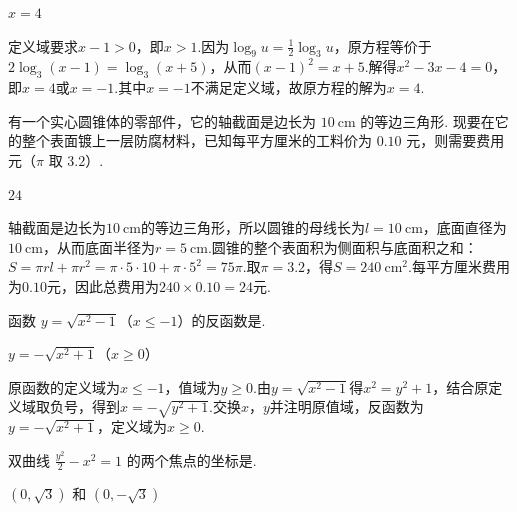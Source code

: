 \begin{answer}
\(x = 4\)
\end{answer}

\begin{solution}
定义域要求\(x-1>0\)，即\(x>1\).因为\(\log_9 u=\frac{1}{2}\log_3u\)，原方程等价于\(2\log_3(x-1)=\log_3(x+5)\)，从而\((x-1)^2=x+5\).解得\(x^2-3x-4=0\)，即\(x=4\)或\(x=-1\).其中\(x=-1\)不满足定义域，故原方程的解为\(x=4\).
\end{solution}

\begin{problem}
有一个实心圆锥体的零部件，它的轴截面是边长为 \(10\mathrm{~cm}\) 的等边三角形. 现要在它的整个表面镀上一层防腐材料，已知每平方厘米的工料价为 \(0.10\) 元，则需要费用\fillinblank{} 元（\(\pi\) 取 \(3.2\)）.
\end{problem}

\begin{answer}
\(24\)
\end{answer}

\begin{solution}
轴截面是边长为\(10\mathrm{~cm}\)的等边三角形，所以圆锥的母线长为\(l=10\mathrm{~cm}\)，底面直径为\(10\mathrm{~cm}\)，从而底面半径为\(r=5\mathrm{~cm}\).圆锥的整个表面积为侧面积与底面积之和：\(S=\pi rl+\pi r^2=\pi\cdot5\cdot10+\pi\cdot5^2=75\pi\).取\(\pi=3.2\)，得\(S=240\mathrm{~cm^2}\).每平方厘米费用为\(0.10\)元，因此总费用为\(240\times0.10=24\)元.
\end{solution}

\begin{problem}
函数 \(y = \sqrt{x^2 - 1}\)（\(x \leqslant -1\)）的反函数是\fillinblank{}.
\end{problem}

\begin{answer}
\(y = -\sqrt{x^2 + 1}\)（\(x \geqslant 0\)）
\end{answer}

\begin{solution}
原函数的定义域为\(x\leqslant-1\)，值域为\(y\geqslant0\).由\(y=\sqrt{x^2-1}\)得\(x^2=y^2+1\)，结合原定义域取负号，得到\(x=-\sqrt{y^2+1}\).交换\(x\)，\(y\)并注明原值域，反函数为\(y=-\sqrt{x^2+1}\)，定义域为\(x\geqslant0\).
\end{solution}

\begin{problem}
双曲线 \(\frac{y^2}{2} - x^2 = 1\) 的两个焦点的坐标是\fillinblank{}.
\end{problem}

\begin{answer}
\((0,\sqrt{3})\) 和 \((0,-\sqrt{3})\)
\end{answer}

